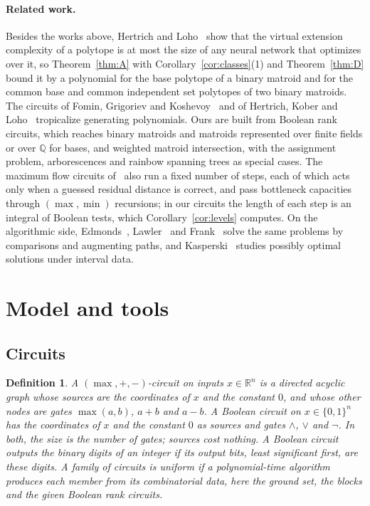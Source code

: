 \documentclass[11pt]{article}
\newtheorem{definition}[theorem]{Definition}
\newcommand{\R}{\mathbb R}
\begin{document}
\paragraph{Related work.}
Besides the works above, Hertrich and Loho~\cite{hertrich-loho26} show that the
virtual extension complexity of a polytope is at most the size of any neural
network that optimizes over it, so Theorem~\ref{thm:A} with Corollary~\ref{cor:classes}(1) and
Theorem~\ref{thm:D} bound it by a polynomial for the base polytope of a binary
matroid and for the common base and common independent set polytopes of two
binary matroids.  The circuits of Fomin, Grigoriev and
Koshevoy~\cite{fgk16} and of Hertrich, Kober and
Loho~\cite{hertrich-kober-loho26} tropicalize generating polynomials.  Ours are
built from Boolean rank circuits, which reaches binary matroids and matroids
represented over finite fields or over $\mathbb Q$ for bases, and weighted
matroid intersection, with the assignment problem, arborescences and rainbow
spanning trees as special cases.  The maximum flow circuits of~\cite{hertrich-sering25} also run a fixed number
of steps, each of which acts only when a guessed residual distance is correct,
and pass bottleneck capacities through $(\max,\min)$ recursions; in our circuits
the length of each step is an integral of Boolean tests, which
Corollary~\ref{cor:levels} computes.  On the algorithmic side,
Edmonds~\cite{edmonds70,edmonds71}, Lawler~\cite{lawler75} and
Frank~\cite{frank81} solve the same problems by comparisons and augmenting paths,
and Kasperski~\cite{kasperski08} studies possibly optimal solutions under
interval data.

\section{Model and tools}
\label{sec:model}

\subsection{Circuits}

\begin{definition}
\label{def:circuits}
A \emph{$(\max,+,-)$-circuit} on inputs $x\in\R^{n}$ is a directed acyclic
graph whose sources are the coordinates of $x$ and the constant $0$, and whose
other nodes are gates $\max(a,b)$, $a+b$ and $a-b$.  A \emph{Boolean circuit}
on $x\in\{0,1\}^{n}$ has the coordinates of $x$ and the constant $0$ as sources
and gates $\wedge$, $\vee$ and $\neg$.  In both, the size is the number of gates;
sources cost nothing.  A Boolean circuit \emph{outputs the
binary digits} of an integer if its output bits, least significant first, are
these digits.  A family of circuits is \emph{uniform} if a
polynomial-time algorithm produces each member from its combinatorial data,
here the ground set, the blocks and the given Boolean rank circuits.
\end{definition}
\end{document}
